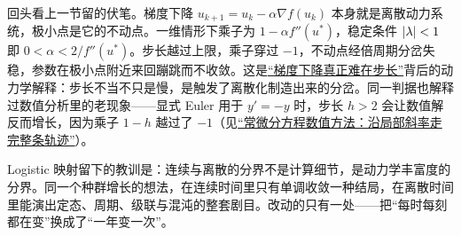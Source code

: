 回头看上一节留的伏笔。梯度下降 \(u_{k+1}=u_k-\alpha\nabla f(u_k)\) 本身就是离散动力系统，极小点是它的不动点。一维情形下乘子为 \(1-\alpha f''(u^\ast)\)，稳定条件 \(\left|\lambda\right|<1\) 即 \(0<\alpha<2/f''(u^\ast)\)。步长越过上限，乘子穿过 \(-1\)，不动点经倍周期分岔失稳，参数在极小点附近来回蹦跳而不收敛。这是\hyperref[sec:09-Convex-Optimization/06-Optimization-Algorithms/01]{``梯度下降真正难在步长''}背后的动力学解释：步长不当不只是慢，是触发了离散化制造出来的分岔。同一判据也解释过数值分析里的老现象——显式 Euler 用于 \(y'=-y\) 时，步长 \(h>2\) 会让数值解反而增长，因为乘子 \(1-h\) 越过了 \(-1\)（见\hyperref[ch:066]{``常微分方程数值方法：沿局部斜率走完整条轨迹''}）。

Logistic 映射留下的教训是：连续与离散的分界不是计算细节，是动力学丰富度的分界。同一个种群增长的想法，在连续时间里只有单调收敛一种结局，在离散时间里能演出定态、周期、级联与混沌的整套剧目。改动的只有一处——把``每时每刻都在变''换成了``一年变一次''。
